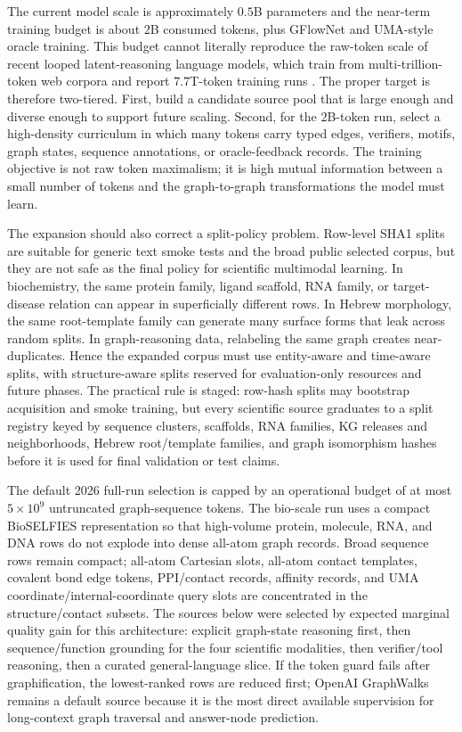 \documentclass[11pt]{article}
\newcommand{\1}{\mathbf{1}}
\begin{document}
The current model scale is approximately $0.5$B parameters and the near-term training budget is about $2$B consumed tokens, plus GFlowNet and UMA-style oracle training. This budget cannot literally reproduce the raw-token scale of recent looped latent-reasoning language models, which train from multi-trillion-token web corpora and report $7.7$T-token training runs \cite{ZhuOuro2025,FineWebEdu2024,DCLM2024,Dolma2024}. The proper target is therefore two-tiered. First, build a candidate source pool that is large enough and diverse enough to support future scaling. Second, for the $2$B-token run, select a high-density curriculum in which many tokens carry typed edges, verifiers, motifs, graph states, sequence annotations, or oracle-feedback records. The training objective is not raw token maximalism; it is high mutual information between a small number of tokens and the graph-to-graph transformations the model must learn.

The expansion should also correct a split-policy problem. Row-level SHA1 splits are suitable for generic text smoke tests and the broad public selected corpus, but they are not safe as the final policy for scientific multimodal learning. In biochemistry, the same protein family, ligand scaffold, RNA family, or target-disease relation can appear in superficially different rows. In Hebrew morphology, the same root-template family can generate many surface forms that leak across random splits. In graph-reasoning data, relabeling the same graph creates near-duplicates. Hence the expanded corpus must use entity-aware and time-aware splits, with structure-aware splits reserved for evaluation-only resources and future phases. The practical rule is staged: row-hash splits may bootstrap acquisition and smoke training, but every scientific source graduates to a split registry keyed by sequence clusters, scaffolds, RNA families, KG releases and neighborhoods, Hebrew root/template families, and graph isomorphism hashes before it is used for final validation or test claims.

The default 2026 full-run selection is capped by an operational budget of at most \(5\times 10^9\) untruncated graph-sequence tokens. The bio-scale run uses a compact BioSELFIES representation so that high-volume protein, molecule, RNA, and DNA rows do not explode into dense all-atom graph records. Broad sequence rows remain compact; all-atom Cartesian slots, all-atom contact templates, covalent bond edge tokens, PPI/contact records, affinity records, and UMA coordinate/internal-coordinate query slots are concentrated in the structure/contact subsets. The sources below were selected by expected marginal quality gain for this architecture: explicit graph-state reasoning first, then sequence/function grounding for the four scientific modalities, then verifier/tool reasoning, then a curated general-language slice. If the token guard fails after graphification, the lowest-ranked rows are reduced first; OpenAI GraphWalks remains a default source because it is the most direct available supervision for long-context graph traversal and answer-node prediction.
\end{document}
